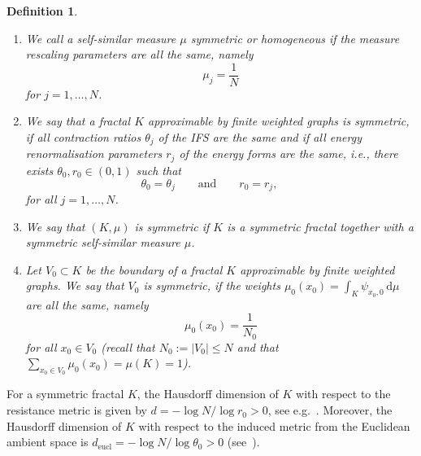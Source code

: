 \documentclass[12pt,reqno,a4paper]{amsart}            %
\numberwithin{equation}{section}
\theoremstyle{mythmstyle}       %
\theoremstyle{mydefstyle}        %
\newtheorem{definition}[theorem]{Definition}
\newcommand{\card}[1]{\lvert#1\rvert}   %
\newcommand{\dd}    {\, \mathrm d}    %
\newcommand{\1}{\mathbbm 1}                    %
\newcommand{\qquadtext}[1]{\qquad\text{#1}\qquad}
\newcommand{\eucl}{\mathrm{eucl}}
\begin{document}
\begin{definition}
  \label{def:frac.symm}
  \indent
  \begin{enumerate}
  \item  
    \label{frac.symm.a}
    We call a self-similar measure $\mu$ \emph{symmetric} or
    \emph{homogeneous} if the measure rescaling parameters are all the
    same, namely
    \begin{equation*}
      \mu_j=\frac 1N
    \end{equation*}
    for $j=1,\dots, N$.
    
  \item 
    \label{frac.symm.b}
    We say that a fractal $K$ approximable by finite weighted graphs
    is \emph{symmetric}, if all contraction ratios $\theta_j$ of the
    IFS are the same and if all energy renormalisation parameters
    $r_j$ of the energy forms are the same, i.e., there exists
    $\theta_0,r_0 \in (0,1)$ such that
    \begin{equation*}
      \theta_0=\theta_j
      \qquadtext{and}
      r_0=r_j, \qquad
    \end{equation*}
    for all $j=1,\dots, N$.
  \item 
    \label{frac.symm.c}
    We say that $(K,\mu)$ is symmetric if $K$ is a symmetric fractal
    together with a symmetric self-similar measure $\mu$.

  \item 
    \label{frac.symm.d}
    Let $V_0 \subset K$ be the boundary of a fractal $K$ approximable
    by finite weighted graphs.  We say that $V_0$ is \emph{symmetric},
    if the weights $\mu_0(x_0)=\int_K \psi_{x_0,0} \dd \mu$ are all
    the same, namely
    \begin{equation*}
      \mu_0(x_0)=\frac 1{N_0}
    \end{equation*}
    for all $x_0 \in V_0$ (recall that $N_0:=\card {V_0} \le N$ and
    that $\sum_{x_0 \in V_0} \mu_0(x_0)=\mu(K)=1$).
  \end{enumerate}
\end{definition}

For a symmetric fractal $K$, the Hausdorff dimension of $K$ with
respect to the resistance metric is given by $d=-\log N/\log r_0>0$,
see e.g.~\cite[Thm.~4.2.1]{kigami:01}.  Moreover, the Hausdorff
dimension of $K$ with respect to the induced metric from the Euclidean
ambient space is $d_\eucl= -\log N/\log \theta_0>0$
(see~\cite[Sec.~1.5]{kigami:01}).
\end{document}
